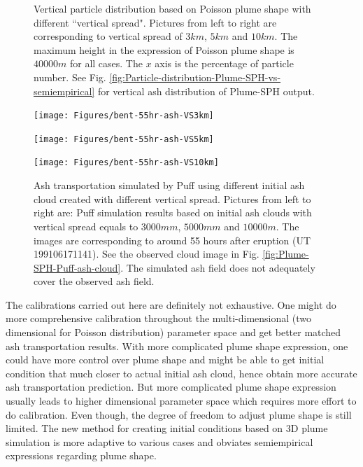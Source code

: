 \documentclass[draft,linenumbers]{agujournal2019}
\begin{document}
\begin{figure}[!htb]
\begin{minipage}{.325 \textwidth}
    \end{minipage}%
    \caption{Vertical particle distribution based on Poisson plume shape with different ``vertical spread". Pictures from left to right are corresponding to vertical spread of $3km$, $5km$ and $10 km$. The maximum height in the expression of Poisson plume shape is $40000 m$ for all cases. The $x$ axis is the percentage of particle number. See Fig. \ref{fig:Particle-distribution-Plume-SPH-vs-semiempirical} for vertical ash distribution of Plume-SPH output.}
    \label{fig:poisson-vertical-spread}
\end{figure}

\begin{figure}[!htb]
    \centering
    \begin{minipage}{.325\textwidth}
        \centering
        \texttt{[image: Figures/bent-55hr-ash-VS3km]}
    \end{minipage}%
    \begin{minipage}{.325 \textwidth}
        \centering
        \texttt{[image: Figures/bent-55hr-ash-VS5km]}
    \end{minipage}%
    \begin{minipage}{.325 \textwidth}
        \centering
        \texttt{[image: Figures/bent-55hr-ash-VS10km]}
    \end{minipage}%
    \caption{Ash transportation simulated by Puff using different initial ash cloud created with different vertical spread. Pictures from left to right are: Puff simulation results based on initial ash clouds with vertical spread equals to $3000m m$, $5000m m$ and $10000 m$. The images are corresponding to around 55 hours after eruption (UT 199106171141). See the observed cloud image in Fig. \ref{fig:Plume-SPH-Puff-ash-cloud}. The simulated ash field does not adequately cover the observed ash field.}
    \label{fig:Various-vertical-spread-Pinatubo-ash-cloud}
\end{figure}

The calibrations carried out here are definitely not exhaustive. One might do more comprehensive calibration throughout the multi-dimensional (two dimensional for Poisson distribution) parameter space and get better matched ash transportation results. With more complicated plume shape expression, one could have more control over plume shape and might be able to get initial condition that much closer to actual initial ash cloud, hence obtain more accurate ash transportation prediction. But more complicated plume shape expression usually leads to higher dimensional parameter space which requires more effort to do calibration. Even though, the degree of freedom to adjust plume shape is still limited. The new method for creating initial conditions based on 3D plume simulation is more adaptive to various cases and obviates semiempirical expressions regarding plume shape.
\end{document}
